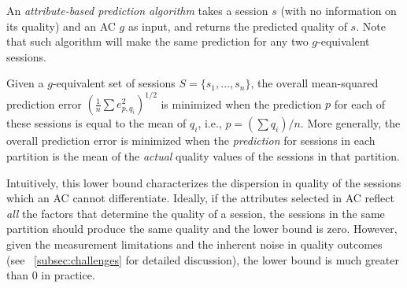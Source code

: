 
 An {\it
  attribute-based prediction algorithm} takes a session $s$ (with no
information on its quality) and an AC $g$ as input, and returns the
predicted quality of $s$. Note that such algorithm will make the same
prediction for any two $g$-equivalent sessions.



Given a $g$-equivalent set of sessions $S=\{s_1,\dots,s_n\}$, the
overall mean-squared prediction error $\left(\frac{1}{n}\sum
  e_{p,q_i}^2\right)^{1/2}$ is minimized when the prediction $p$ for
each of these sessions is equal to the mean of $q_i$, i.e., $p = (\sum
q_i)/n$. More generally, the overall prediction error is minimized
when the \emph{prediction} for sessions in each partition is the mean
of the \emph{actual} quality values of the sessions in that partition.

Intuitively, this lower bound characterizes the dispersion in quality
of the sessions which an AC cannot differentiate. Ideally, if the
attributes selected in AC reflect \emph{all} the factors that
determine the quality of a session, the sessions in the same partition
should produce the same quality and the lower bound is zero. However,
given the measurement limitations and the inherent noise in quality outcomes (see
\Section~\ref{subsec:challenges} for detailed discussion), the lower bound is much greater than $0$ in practice.


